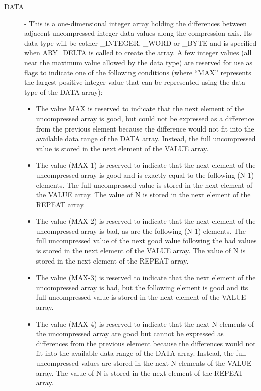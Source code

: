 \documentclass[twoside,11pt,nolof]{starlink}
\begin{document}
\begin{description}

\item[DATA] - This is a one-dimensional integer array holding the differences
between adjacent uncompressed integer data values along the compression
axis. Its data type will be eother \_INTEGER, \_WORD or \_BYTE and is
specified when ARY\_DELTA is called to create the array. A few integer
values (all near the maximum value allowed by the data type) are reserved
for use as flags to indicate one of the following conditions (where
``MAX'' represents the largest positive integer value that can be
represented using the data type of the DATA array):

\begin{itemize}

\item The value MAX is reserved to indicate that the next element of the
uncompressed array is good, but could not be expressed as a difference from
the previous element because the difference would not fit into the
available data range of the DATA array. Instead, the full uncompressed value
is stored in the next element of the VALUE array.

\item The value (MAX-1) is reserved to indicate that the next element of
the uncompressed array is good and is exactly equal to the following (N-1)
elements. The full uncompressed value is stored in the next element of the
VALUE array. The value of N is stored in the next element of the REPEAT array.

\item The value (MAX-2) is reserved to indicate that the next element of
the uncompressed array is bad, as are the following (N-1) elements. The full
uncompressed value of the next good value following the bad values is stored
in the next element of the VALUE array. The value of N is stored in the next
element of the REPEAT array.

\item The value (MAX-3) is reserved to indicate that the next element of
the uncompressed array is bad, but the following element is good and its
full uncompressed value is stored in the next element of the VALUE array.

\item The value (MAX-4) is reserved to indicate that the next N elements of
the uncompressed array are good but cannot be expressed as differences from
the previous element because the differences would not fit into the available
data range of the DATA array. Instead, the full uncompressed values are
stored in the next N elements of the VALUE array. The value of N is
stored in the next element of the REPEAT array.


\end{itemize}
\end{description}
\end{document}
